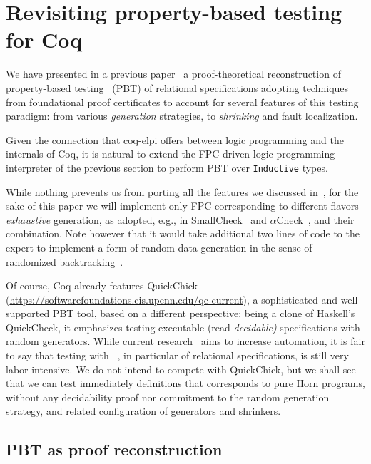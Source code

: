 \section{Revisiting property-based testing for Coq}

We have presented in a previous paper~\cite{blanco19ppdp} a
proof-theoretical reconstruction of property-based testing~\cite{fink97sen} (PBT) of
relational specifications adopting techniques from foundational proof
certificates to account for several features of this testing
paradigm: from various \emph{generation} strategies, to
\emph{shrinking} and fault localization.

Given the connection that \textsf{coq-elpi} offers between logic
programming and the internals of Coq, it is natural to extend the
FPC-driven logic programming interpreter of the previous section to
perform PBT over \lstinline{Inductive} types.

While nothing prevents us from porting all the features we discussed
in~\cite{blanco19ppdp}, for the sake of this paper we will implement
only FPC corresponding to different flavors \emph{exhaustive}
generation, as adopted, e.g., in SmallCheck~\cite{smallcheck} and
$\alpha$Check~\cite{cheney_momigliano_2017}, and their combination. Note however that it would take additional two lines of code to the  expert to implement a form of random data generation in the sense of randomized backtracking~\cite{pltredexconstraintlogic}.

Of course, Coq already features \textsf{QuickChick}~\cite{QChick}
(\url{https://softwarefoundations.cis.upenn.edu/qc-current}),  a
sophisticated and well-supported PBT tool, based on a different
perspective: being a clone of Haskell's QuickCheck, it emphasizes
testing executable (read \emph{decidable)} specifications with random
generators. While current research~\cite{LampropoulosPP18} aims to
increase automation, it is fair to say that testing with ~\cite{QChick}, in particular of
relational specifications, is still very labor intensive. We do not
intend to compete with \textsf{QuickChick}, but we shall see that we
can test immediately  definitions that
corresponds to pure Horn programs, without any decidability proof nor
commitment to the random generation strategy, and related
configuration of generators and shrinkers.

\subsection{PBT as proof reconstruction}
\label{ssec:pbt-lp}

